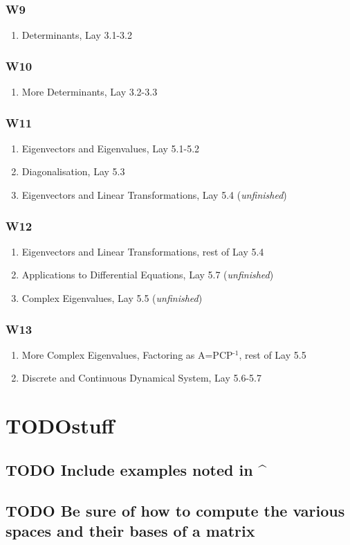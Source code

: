 \documentclass[11pt]{article}
\begin{document}
\subsubsection{W9}
\label{sec-1-2-2}
\begin{enumerate}
\item Determinants, Lay 3.1-3.2
\label{sec-1-2-2-1}
\end{enumerate}
\subsubsection{W10}
\label{sec-1-2-3}
\begin{enumerate}
\item More Determinants, Lay 3.2-3.3
\label{sec-1-2-3-1}
\end{enumerate}
\subsubsection{W11}
\label{sec-1-2-4}
\begin{enumerate}
\item Eigenvectors and Eigenvalues, Lay 5.1-5.2
\label{sec-1-2-4-1}
\item Diagonalisation, Lay 5.3
\label{sec-1-2-4-2}
\item Eigenvectors and Linear Transformations, Lay 5.4 (\emph{unfinished})
\label{sec-1-2-4-3}
\end{enumerate}
\subsubsection{W12}
\label{sec-1-2-5}
\begin{enumerate}
\item Eigenvectors and Linear Transformations, rest of Lay 5.4
\label{sec-1-2-5-1}
\item Applications to Differential Equations, Lay 5.7 (\emph{unfinished})
\label{sec-1-2-5-2}
\item Complex Eigenvalues, Lay 5.5 (\emph{unfinished})
\label{sec-1-2-5-3}
\end{enumerate}
\subsubsection{W13}
\label{sec-1-2-6}
\begin{enumerate}
\item More Complex Eigenvalues, Factoring as A=PCP$^{\text{-1}}$, rest of Lay 5.5
\label{sec-1-2-6-1}
\item Discrete and Continuous Dynamical System, Lay 5.6-5.7
\label{sec-1-2-6-2}
\end{enumerate}
\section{TODOstuff}
\label{sec-2}
\subsection{{\bfseries\sffamily TODO} Include examples noted in \^{}}
\label{sec-2-1}
\subsection{{\bfseries\sffamily TODO} Be sure of how to compute the various spaces and their bases of a matrix}
\label{sec-2-2}
\end{document}

